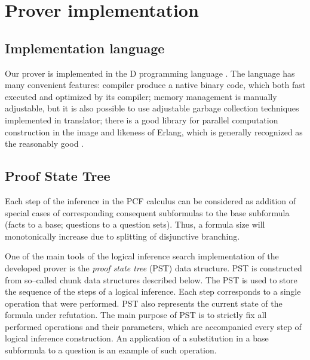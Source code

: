\documentclass[runningheads,a4paper]{llncs}
\begin{document}
\section{Prover implementation}

\subsection{Implementation language}

Our prover is implemented in the D programming language \cite{DPL1,DPL2}. The language has many convenient features: compiler produce a native binary code, which both fast executed and optimized by its compiler; memory management is manually adjustable, but it is also possible to use adjustable garbage collection techniques implemented in translator; there is a good library for parallel computation construction in the image and likeness of Erlang, which is generally recognized as the reasonably good \cite{Erlang1}.

\subsection{Proof State Tree}


Each step of the inference in the PCF calculus can be considered as addition of special cases of corresponding consequent subformulas to the base subformula (facts to a base; questions to a question sets). Thus, a formula size will monotonically increase due to splitting of disjunctive branching.

One of the main tools of the logical inference search implementation of the developed prover is the \emph{proof state tree} (PST) data structure.  PST is constructed from so--called chunk data structures described below. The PST is used to store the sequence of the steps of a logical inference. Each step corresponds to a single operation that were performed. PST also represents the current state of the formula under refutation. The main purpose of PST is to strictly fix all performed operations and their parameters, which are accompanied every step of logical inference construction. An application of a substitution in a base subformula to a question is an example of such operation.

\end{document}
